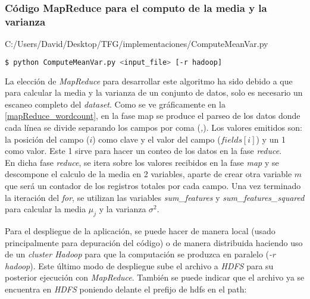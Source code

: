 \newpage  
  
\subsubsection*{Código MapReduce para el computo de la media y la varianza}
  

                {C:/Users/David/Desktop/TFG/implementaciones/ComputeMeanVar.py}

\begin{lstlisting}[language=bash, numbers=none]
$ python ComputeMeanVar.py <input_file> [-r hadoop]
\end{lstlisting}

La elección de \textit{MapReduce} para desarrollar este algoritmo ha sido debido a que para calcular la media y 
la varianza de un conjunto de datos, solo es necesario un escaneo completo del \textit{dataset}. Como se ve
gráficamente en la \autoref{mapReduce_wordcount}, en la fase map se produce el parseo de los datos donde cada línea
se divide separando los campos por coma (\textit{,}). Los valores emitidos son: la posición del campo ($i$) como clave
y el valor del campo ($fields[i]$) y un 1 como valor. Este 1 sirve para hacer un conteo de los datos en la fase 
\textit{reduce}.\\
En dicha fase \textit{reduce}, se itera sobre los valores recibidos en la fase \textit{map} y se descompone el calculo
de la media en 2 variables, aparte de crear otra variable $m$ que será un contador de los registros totales por cada campo.
Una vez terminado la iteración del \textit{for}, se utilizan las variables \textit{sum\_features} y 
\textit{sum\_features\_squared} para calcular la media $\mu_j$ y la varianza $\sigma^2$.
\newline

Para el despliegue de la aplicación, se puede hacer de manera local (usado principalmente para depuración del código)
o de manera distribuida haciendo uso de un \textit{cluster Hadoop} para que la computación se produzca en paralelo
(\textit{-r hadoop}). Este último modo de despliegue sube el archivo  a \textit{HDFS} para su 
posterior ejecución con \textit{MapReduce}. También se puede indicar que el archivo ya se encuentra en \textit{HDFS}
poniendo delante el prefijo de hdfs en el path: 
  
\newpage

